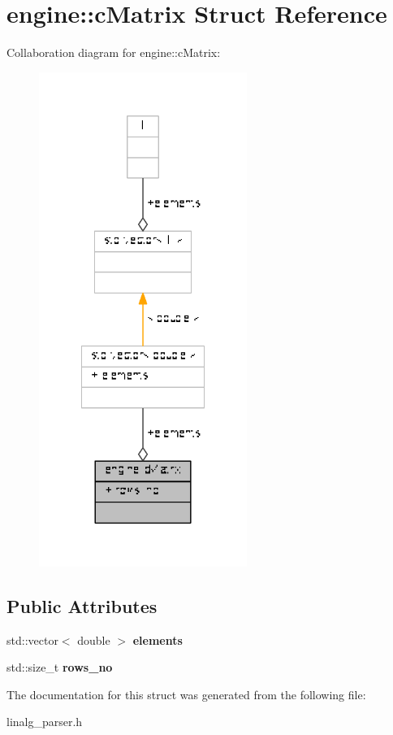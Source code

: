 \hypertarget{structengine_1_1cMatrix}{\section{engine\-:\-:c\-Matrix Struct Reference}
\label{structengine_1_1cMatrix}
}


Collaboration diagram for engine\-:\-:c\-Matrix\-:
\nopagebreak
\begin{figure}[H]
\begin{center}
\leavevmode
\includegraphics[width=192pt]{structengine_1_1cMatrix__coll__graph}
\end{center}
\end{figure}
\subsection*{Public Attributes}
\begin{DoxyCompactItemize}
\item 
\hypertarget{structengine_1_1cMatrix_a8124c960bd951f09fd4359e8287adf6c}{std\-::vector$<$ double $>$ {\bfseries elements}}\label{structengine_1_1cMatrix_a8124c960bd951f09fd4359e8287adf6c}

\item 
\hypertarget{structengine_1_1cMatrix_af4c58d1e785c85463ffb8df2198420e4}{std\-::size\-\_\-t {\bfseries rows\-\_\-no}}\label{structengine_1_1cMatrix_af4c58d1e785c85463ffb8df2198420e4}

\end{DoxyCompactItemize}


The documentation for this struct was generated from the following file\-:\begin{DoxyCompactItemize}
\item 
linalg\-\_\-parser.\-h\end{DoxyCompactItemize}
